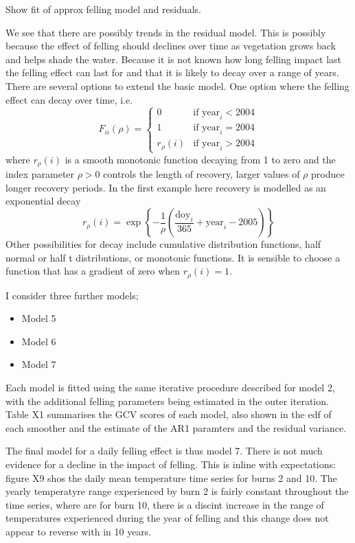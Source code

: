 Show fit of approx felling model and residuals.

We see that there are possibly trends in the residual model.  This is possibly because the effect of felling should declines over time as vegetation grows back and helps shade the water.  Because it is not known how long felling impact last the felling effect can last for and that it is likely to decay over a range of years. There are several options to extend the basic model.  One option where the felling effect can decay over time, i.e.
\begin{equation}
  F_{ii}(\rho) = 
    \begin{cases}
      0    & \text{if } \text{year}_i < 2004 \\
      1    & \text{if } \text{year}_i = 2004 \\
      r_\rho(i) & \text{if } \text{year}_i > 2004
  \end{cases}
\end{equation}
where $r_\rho(i)$ is a smooth monotonic function decaying from 1 to zero and the index parameter $\rho > 0$ controls the length of recovery, larger values of $\rho$ produce longer recovery periods.  In the first example here recovery is modelled as an exponential decay
\begin{equation}
  r_\rho(i) = \exp\left\{ - \dfrac{1}{\rho} \left(\dfrac{\text{doy}_i}{365} + \text{year}_i - 2005\right)\right\}
\end{equation}
Other possibilities for decay include cumulative distribution functions, half normal or half t distributions, or monotonic functions.  It is sensible to choose a function that has a gradient of zero when $r_\rho(i) = 1$.  

I consider three further models;
\begin{itemize}
\item Model 5
\item Model 6
\item Model 7
\end{itemize}

Each model is fitted using the same iterative procedure described for model 2, with the additional felling parameters being estimated in the outer iteration.  Table X1 summarises the GCV scores of each model, also shown in the edf of each smoother and the estimate of the AR1 paramters and the residual variance.

The final model for a daily felling effect is thus model 7.  There is not much evidence for a decline in the impact of felling.  This is inline with expectations: figure X9 shos the daily mean temperature time series for burns 2 and 10.  The yearly temperatyre range experienced by burn 2 is fairly constant throughout the time series, where are for burn 10, there is a discint increase in the range of temperatures experienced during the year of felling and this change does not appear to reverse with in 10 years.


